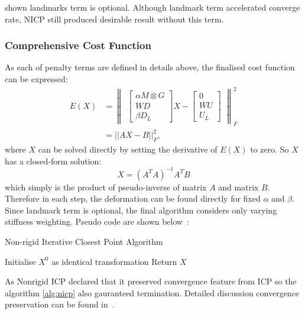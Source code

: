 \cite{Amberg2007} shown landmarks term is optional. Although landmark term accelerated converge rate, NICP still produced desirable result without this term.

\subsubsection{Comprehensive Cost Function}
As each of penalty terms are defined in details above, the finalised cost function can be expressed:
\begin{align}
\label{eq:nicpfinal}
E(X) &= 
\begin{Vmatrix}
    \begin{bmatrix}
        \alpha M \otimes G \\ WD \\ \beta D_L
    \end{bmatrix}
    X- 
    \begin{bmatrix}
        0 \\ WU \\ U_L
    \end{bmatrix}
\end{Vmatrix}
^2_F \\
&= ||AX-B||^2_F,
\end{align}
where $X$ can be solved directly by setting the derivative of $E(X)$ to zero. So $X$ has a closed-form solution:
\begin{equation}
\label{eq:nicpx}
X=(A^TA)^{-1}A^TB
\end{equation}
which simply is the product of pseudo-inverse of matrix $A$ and matrix $B$. Therefore in each step, the deformation can be found directly for fixed $\alpha$ and $\beta$. Since landmark term is optional, the final algorithm considers only varying stiffness weighting. Pseudo code are shown below~\cite{Amberg2007}:
\begin{algorithm}[ht]
\caption{Non-rigid Iterative Closest Point Algorithm}
\label{alg:nicp}
Initialise $X^0$ as identical transformation\;
Return $X$\;
\end{algorithm}

As Nonrigid ICP declared that it preserved convergence feature from ICP so the algorithm \ref{alg:nicp} also gauranteed termination. Detailed discussion convergence preservation can be found in~\cite{Amberg2007}.